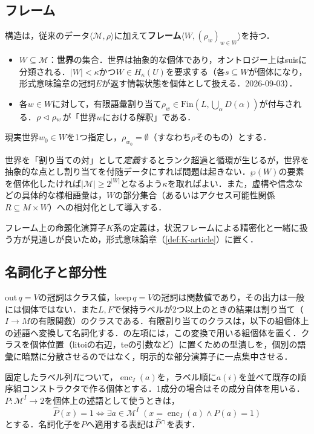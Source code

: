 \documentclass[../../main-detail.tex]{subfiles}
\begin{document}
\subsection{フレーム}\label{subsec:frame}
\begin{definition}[フレーム]
    構造は，従来のデータ$\langle \mathcal{M}, \rho\rangle$に加えて\textbf{フレーム}$\langle W, (\rho_w)_{w\in W}\rangle$を持つ．
    \begin{itemize}
        \item $W \subseteq \mathcal{M}$：\textbf{世界}の集合．世界は抽象的な個体であり，オントロジー上はsuisに分類される．$|W| < \kappa$かつ$W \in H_\kappa(U)$を要求する（各$s \subseteq W$が個体になり，形式意味論章の冠詞$E$が返す情報状態を個体として扱える．2026-09-03）．
        \item 各$w \in W$に対して，有限語彙割り当て$\rho_w \in \mathrm{Fin}(L, \bigcup_\alpha D(\alpha))$が付与される．$\rho \vartriangleleft \rho_w$が「世界$w$における解釈」である．
    \end{itemize}
    現実世界$w_0 \in W$を1つ指定し，$\rho_{w_0} = \emptyset$（すなわち$\rho$そのもの）とする．
\end{definition}
\begin{remark}
    世界を「割り当ての対」として\emph{定義}するとランク超過と循環が生じるが，世界を抽象的な点とし割り当てを付随データにすれば問題は起きない．$\wp(W)$の要素を個体化したければ$|\mathcal{M}| \ge 2^{|W|}$となるよう$\kappa$を取ればよい．また，虚構や信念などの具体的な様相語彙は，$W$の部分集合（あるいはアクセス可能性関係$R \subseteq M \times W$）への相対化として導入する．
\end{remark}

フレーム上の命題化演算子$K$系の定義は，状況フレームによる精密化と一緒に扱う方が見通しが良いため，形式意味論章（\ref{def:K-article}）に置く．
\subsection{名詞化子と部分性}\label{subsec:nominalizer}
$\mathrm{out}\,q=V$の冠詞はクラス値，$\mathrm{keep}\,q=V$の冠詞は関数値であり，その出力は一般には個体ではない．また$L, F$で保持ラベルが2つ以上のときの結果は割り当て（$I\to M$の有限関数）のクラスである．有限割り当てのクラスは，以下の組個体上の述語へ変換して名詞化する．の左項には，この変換で用いる組個体を置く．クラスを個体位置（litoiの右辺，teの引数など）に置くための型潰しを，個別の語彙に暗黙に分散させるのではなく，明示的な部分演算子に一点集中させる．

\begin{definition}[割り当ての述語化]
    固定したラベル列$I$について，$\operatorname{enc}_I(a)$を，ラベル順に$a(i)$を並べて既存の順序組コンストラクタで作る個体とする．1成分の場合はその成分自体を用いる．$P:\mathcal M^I\to 2$を個体上の述語として使うときは，
    \[
        \widehat P(x)=1\iff\exists a\in\mathcal M^I\;(x=\operatorname{enc}_I(a)\land P(a)=1)
    \]
    とする．名詞化子を$P$へ適用する表記は${{\widehat P}^\cap}$を表す．
\end{definition}
\end{document}
